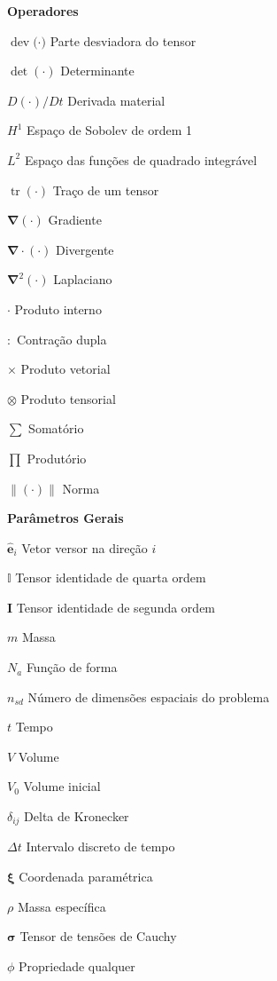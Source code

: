 \documentclass[12pt,
	openright,	%
	twoside,    %
	a4paper,			%
	sumario=tradicional,
	english,			%
	french, 			%
	brazil				%
]{USPSC}
\newcommand{\tr}{\mathop{\mathrm{tr}}\nolimits}
\newcommand{\dev}[1]{\mathop{\mathrm{dev}}\nolimits{#1}}
\newcommand{\BB}[1]{\mathbf{#1}}
\newcommand{\norm}[1]{\left\lVert{#1}\right\lVert}
\begin{document}
\begin{simbolos}
    \item[\textbf{Operadores}]
    \item[$\dev(\cdot)$] Parte desviadora do tensor
    \item[$\det{(\cdot)}$] Determinante
    \item[$D(\cdot)/Dt$] Derivada material
    \item[$H^1$] Espaço de Sobolev de ordem 1
    \item[$L^2$] Espaço das funções de quadrado integrável
    \item[$\tr(\cdot)$] Traço de um tensor
    \item[$\BB{\nabla}(\cdot)$] Gradiente
    \item[$\BB{\nabla}\cdot(\cdot)$] Divergente
    \item[$\BB{\nabla}^2(\cdot)$] Laplaciano
    \item[$\cdot$] Produto interno
    \item[$:$] Contração dupla
    \item[$\times$] Produto vetorial
    \item[$\otimes$] Produto tensorial
    \item[$\sum$] Somatório
    \item[$\prod$] Produtório
    \item[$\norm{(\cdot)}$] Norma

    \item[\textbf{Parâmetros Gerais}]
    \item[$\hat{\BB{e}}_i$] Vetor versor na direção $i$
    \item[$\mathbb{I}$] Tensor identidade de quarta ordem
    \item[$\BB{I}$] Tensor identidade de segunda ordem
    \item[$m$] Massa
    \item[$N_a$] Função de forma
    \item[$n_{sd}$] Número de dimensões espaciais do problema
    \item[$t$] Tempo
    \item[$V$] Volume
    \item[$V_0$] Volume inicial
    \item[$\delta_{ij}$] Delta de Kronecker
    \item[$\Delta t$] Intervalo discreto de tempo
    \item[$\BB{\xi}$] Coordenada paramétrica
    \item[$\rho$] Massa específica
    \item[$\BB{\sigma}$] Tensor de tensões de Cauchy
    \item[$\phi$] Propriedade qualquer


\end{simbolos}
\end{document}
